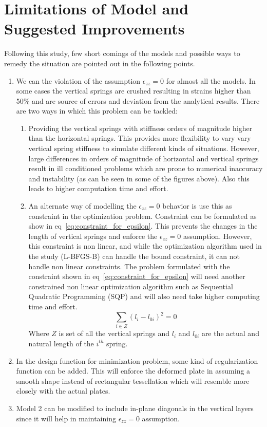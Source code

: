 \section{Limitations of Model and Suggested Improvements}
Following this study, few short comings of the models and possible ways to remedy the situation are pointed out in the following points.
\begin{enumerate}
    \item We can the violation of the assumption $\epsilon_{zz} = 0$ for almost all the models. In some cases the vertical springs are crushed resulting in strains higher than 50\% and are source of errors and deviation from the analytical results. There are two ways in which this problem can be tackled:
    \begin{enumerate}
        \item Providing the vertical springs with stiffness orders of magnitude higher than the horizontal springs. This provides more flexibility to vary vary vertical spring stiffness to simulate different kinds of situations. However, large differences in orders of magnitude of horizontal and vertical springs result in ill conditioned problems which are prone to numerical inaccuracy and instability (as can be seen in some of the figures above). Also this leads to higher computation time and effort.
        \item An alternate way of modelling the $\epsilon_{zz} = 0$ behavior is use this as constraint in the optimization problem. Constraint can be formulated as show in eq~\ref{eq:constraint_for_epsilon}. This prevents the changes in the length of vertical springs and enforce the $\epsilon_{zz} = 0$ assumption. However, this constraint is non linear, and while the optimization algorithm used in the study (L-BFGS-B) can handle the bound constraint, it can not handle non linear constraints. The problem formulated with the constraint shown in eq~\ref{eq:constraint_for_epsilon} will need another constrained non linear optimization algorithm such as Sequential Quadratic Programming (SQP) and will also need take higher computing time and effort.
        \begin{equation}
            \sum_{i \in Z} (l_i - l_{0i})^2 = 0
            \label{eq:constraint_for_epsilon}
        \end{equation}
        Where $Z$ is set of all the vertical springs and $l_i$ and $l_{0i}$ are the actual and natural length of the $i^{th}$ spring.
    \end{enumerate}
    \item In the design function for minimization problem, some kind of regularization function can be added. This will enforce the deformed plate in assuming a smooth shape instead of rectangular tessellation which will resemble more closely with the actual plates.
    \item Model 2 can be modified to include in-plane diagonals in the vertical layers since it will help in maintaining $\epsilon_{zz} = 0$ assumption.
\end{enumerate}
